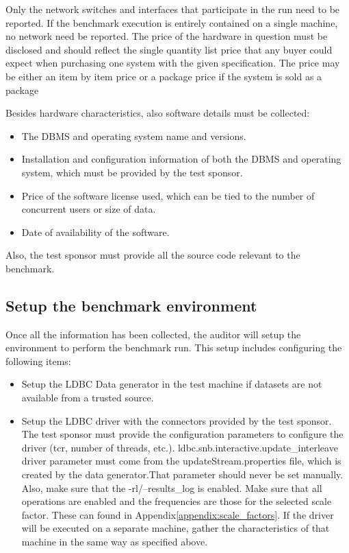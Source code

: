Only the network switches and interfaces that participate in the run need to be
reported. If the benchmark execution is entirely contained on a single machine,
no network need be reported.  The price of the hardware in question must be
disclosed and should reflect the single quantity list price that any buyer
could expect when purchasing one system with the given specification. The price
may be either an item by item price or a package price if the system is sold as
a package

Besides hardware characteristics, also software details must be collected:

\begin{itemize}
\item The DBMS and operating system name and versions.
\item Installation and configuration information of both the DBMS and operating
system, which must be provided by the test sponsor.
\item Price of the software license used, which can be tied to the number of
concurrent users or size of data.
\item Date of availability of the software.
\end{itemize}

Also, the test sponsor must provide all the source code relevant to the
benchmark.

\subsection{Setup the benchmark environment}

Once all the information has been collected, the auditor will setup the
environment to perform the benchmark run. This setup includes configuring the
following items:


\begin{itemize}
\item Setup the LDBC Data generator in the test machine if datasets are not
available from a trusted source.
\item Setup the LDBC driver with the connectors provided by the test sponsor.
The test sponsor must provide the configuration parameters to configure the
driver (tcr, number of threads, etc.).  ldbc.snb.interactive.update\_interleave
driver parameter must come from the updateStream.properties file, which is
created by the data generator.That parameter should never be set manually.
Also, make sure that the -rl/--results\_log is enabled.  Make sure that all
operations are enabled and the frequencies are those for the selected scale
factor. These can found in Appendix\ref{appendix:scale_factors}.  If the driver
will be executed on a separate machine, gather the characteristics of that
machine in the same way as specified above.
\end{itemize}


